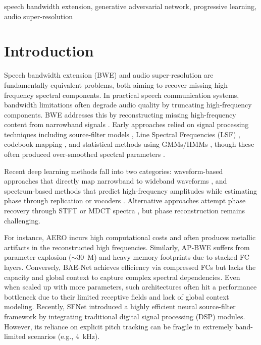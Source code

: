 \documentclass[journal]{IEEEtran}
\begin{document}
\begin{IEEEkeywords}
speech bandwidth extension, generative adversarial network, progressive learning, audio super-resolution
\end{IEEEkeywords}


\IEEEpeerreviewmaketitle



\section{Introduction}

Speech bandwidth extension (BWE) and audio super-resolution are fundamentally equivalent problems, both aiming to recover missing high-frequency spectral components. In practical speech communication systems, bandwidth limitations often degrade audio quality by truncating high-frequency components. BWE addresses this by reconstructing missing high-frequency content from narrowband signals \cite{iser2008bandwidth}. Early approaches relied on signal processing techniques including source-filter models \cite{makhoul1979high}, Line Spectral Frequencies (LSF) \cite{chennoukh2001speech}, codebook mapping \cite{carl1994bandwidth,unno2005robust}, and statistical methods using GMMs/HMMs \cite{jax2003artificial,park2000narrowband}, though these often produced over-smoothed spectral parameters \cite{ling2015deep}.

Recent deep learning methods fall into two categories: waveform-based approaches that directly map narrowband to wideband waveforms \cite{kuleshov2017audio,li2021real,kim2019bandwidth,su2021bandwidth,han2022nu}, and spectrum-based methods that predict high-frequency amplitudes while estimating phase through replication \cite{li2015deep,abel2018simple} or vocoders \cite{botinhao2006frequency}. Alternative approaches attempt phase recovery through STFT \cite{baenet,AP-BWE} or MDCT spectra \cite{shuai2023mdctgan}, but phase reconstruction remains challenging. 


For instance, AERO \cite{aero} incurs high computational costs and often produces metallic artifacts in the reconstructed high frequencies.
Similarly, AP-BWE \cite{AP-BWE} suffers from parameter explosion ($\sim$30~M) and heavy memory footprints due to stacked FC layers. Conversely, BAE-Net \cite{baenet} achieves efficiency via compressed FCs but lacks the capacity and global context to capture complex spectral dependencies. Even when scaled up with more parameters, such architectures often hit a performance bottleneck due to their limited receptive fields and lack of global context modeling. Recently, SFNet \cite{dai2025sfnet} introduced a highly efficient neural source-filter framework by integrating traditional digital signal processing (DSP) modules. However, its reliance on explicit pitch tracking can be fragile in extremely band-limited scenarios (e.g., 4~kHz).
\end{document}

